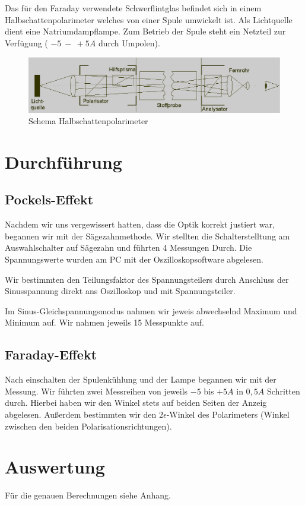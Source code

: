 \documentclass[12pt]{article}
\begin{document}
Das für den Faraday verwendete Schwerflintglas befindet sich in einem Halbschattenpolarimeter welches von einer Spule umwickelt ist. Als Lichtquelle dient eine Natriumdampflampe. Zum Betrieb der Spule steht ein Netzteil zur Verfügung ( $-5~-~+5A$ durch Umpolen).

\begin{figure}[H]
\centering
\includegraphics[width=1\linewidth]{pictures/halbschattenpolarimeter.eps}
\caption{Schema Halbschattenpolarimeter}
\end{figure}


\section{Durchführung}
\subsection{Pockels-Effekt}
Nachdem wir uns vergewissert hatten, dass die Optik korrekt justiert war, begannen wir mit der Sägezahnmethode.
Wir stellten die Schalterstelltung am Auswahlschalter auf Sägezahn und führten 4 Messungen Durch. Die Spannungswerte wurden am PC mit der Oszilloskopsoftware abgelesen.

Wir bestimmten den Teilungsfaktor des Spannungsteilers durch Anschluss der Sinusspannung direkt ans Oszilloskop und mit Spannungsteiler.

Im Sinus-Gleichspannungsmodus nahmen wir jeweis abwechselnd Maximum und Minimum auf. Wir nahmen jeweils 15 Messpunkte auf.

\subsection{Faraday-Effekt}
Nach einschalten der Spulenkühlung und der Lampe begannen wir mit der Messung.
Wir führten zwei Messreihen von jeweils $-5$ bis $+5A$ in $0,5A$ Schritten durch. Hierbei haben wir den Winkel stets auf beiden Seiten der Anzeig abgelesen. Außerdem bestimmten wir den $2\epsilon$-Winkel des Polarimeters (Winkel zwischen den beiden Polarisationsrichtungen).


\section{Auswertung}
Für die genauen Berechnungen siehe Anhang.
\end{document}
